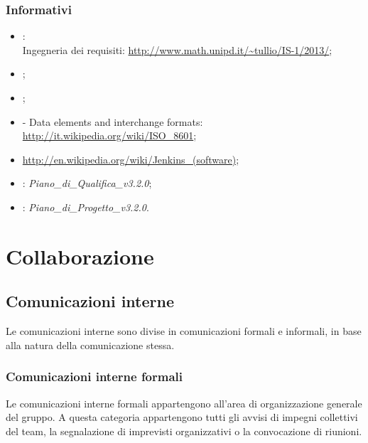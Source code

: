 \subsubsection{Informativi}
\begin{itemize}
\item {}:\\
Ingegneria dei requisiti: \url{http://www.math.unipd.it/~tullio/IS-1/2013/};
\item {};\\
\item {};\\
\item {} - Data elements and interchange formats: \url{http://it.wikipedia.org/wiki/ISO\_8601};
\item {} \url{http://en.wikipedia.org/wiki/Jenkins_(software)};
\item {}: \emph{Piano\_di\_Qualifica\_v3.2.0};
\item {}: \emph{Piano\_di\_Progetto\_v3.2.0}.
\end{itemize}

\newpage
\section{Collaborazione}
\label{3.0}

\subsection{Comunicazioni interne}
\label{3.2}
Le comunicazioni interne sono divise in comunicazioni formali e informali, in base alla natura della comunicazione stessa.

\subsubsection{Comunicazioni interne formali}
Le comunicazioni interne formali appartengono all'area di organizzazione generale del gruppo. A questa categoria appartengono tutti gli avvisi di impegni collettivi del team, la segnalazione di imprevisti organizzativi o la convocazione di riunioni.

